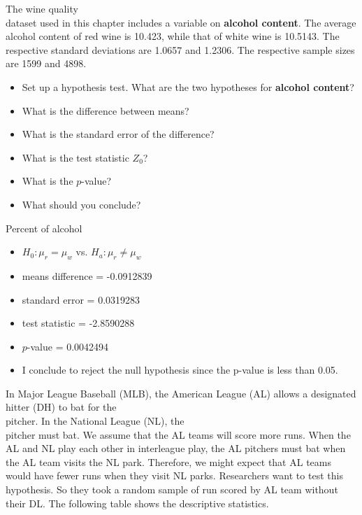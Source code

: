 \documentclass[11pt]{book}\usepackage[]{graphicx}\usepackage[]{color}
\begin{document}
\begin{exercises}
\begin{exercise} %



The wine quality \\ dataset used in this chapter includes a variable on \textbf{alcohol content}. The average alcohol content of red wine is 10.423, while that of white wine is 10.5143. The respective standard deviations are 1.0657 and 1.2306. The respective sample sizes are 1599 and 4898.

\begin{itemize}
  \item Set up a hypothesis test. What are the two hypotheses for \textbf{alcohol content}?
  \item What is the difference between means?
  \item What is the standard error of the difference?
  \item What is the test statistic $Z_0$?
  \item What is the $p$-value?
  \item What should you conclude?
\end{itemize}

\end{exercise}
\begin{solution} %

Percent of alcohol 

\begin{itemize}
  \item $H_0: \mu_r = \mu_w$ vs. $H_a: \mu_r \ne \mu_w$
  \item  means difference = -0.0912839
  \item  standard error  = 0.0319283
  \item  test statistic = -2.8590288
  \item  $p$-value = 0.0042494
  \item  I conclude to reject the null hypothesis since the p-value is less than 0.05.
\end{itemize}

\end{solution}

\begin{exercise} %



In Major League Baseball (MLB), the American League (AL) allows a designated hitter (DH) to bat for the \\ pitcher.  In the National League (NL), the \\  pitcher must bat.  We assume that the AL teams will score more runs.  When the AL and NL play each other in interleague play, the AL pitchers must bat when the AL team visits the NL park.  Therefore,  we might expect that AL teams would have fewer runs when they visit NL parks.  Researchers want to test this hypothesis.  So they took a random sample of run scored by AL team without their DL.  The following table shows the descriptive statistics.


\end{exercise}
\end{exercises}
\end{document}
